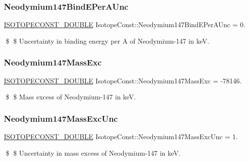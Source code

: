 \subsubsection{\texorpdfstring{Neodymium147\+Bind\+E\+Per\+A\+Unc}{Neodymium147BindEPerAUnc}}
{\footnotesize\ttfamily \mbox{\hyperlink{group___isotope_const-_macros_ga8f45a7272ce02c0b4c65c44636ed719a}{I\+S\+O\+T\+O\+P\+E\+C\+O\+N\+S\+T\+\_\+\+D\+O\+U\+B\+LE}} Isotope\+Const\+::\+Neodymium147\+Bind\+E\+Per\+A\+Unc = 0.}

\$ \$ Uncertainty in binding energy per A of Neodymium-\/147 in keV. \mbox{\label{group___isotope_const-_neodymium-_nd147_ga4005e078ab1aa1b10bbb926279dfeaf1}} 
\subsubsection{\texorpdfstring{Neodymium147\+Mass\+Exc}{Neodymium147MassExc}}
{\footnotesize\ttfamily \mbox{\hyperlink{group___isotope_const-_macros_ga8f45a7272ce02c0b4c65c44636ed719a}{I\+S\+O\+T\+O\+P\+E\+C\+O\+N\+S\+T\+\_\+\+D\+O\+U\+B\+LE}} Isotope\+Const\+::\+Neodymium147\+Mass\+Exc = -\/78146.}

\$ \$ Mass excess of Neodymium-\/147 in keV. \mbox{\label{group___isotope_const-_neodymium-_nd147_ga84a8f984402d5f96350df51423b66519}} 
\subsubsection{\texorpdfstring{Neodymium147\+Mass\+Exc\+Unc}{Neodymium147MassExcUnc}}
{\footnotesize\ttfamily \mbox{\hyperlink{group___isotope_const-_macros_ga8f45a7272ce02c0b4c65c44636ed719a}{I\+S\+O\+T\+O\+P\+E\+C\+O\+N\+S\+T\+\_\+\+D\+O\+U\+B\+LE}} Isotope\+Const\+::\+Neodymium147\+Mass\+Exc\+Unc = 1.}

\$ \$ Uncertainty in mass excess of Neodymium-\/147 in keV. \mbox{\label{group___isotope_const-_neodymium-_nd147_gad95dd738844b9fc04b5e71c8650536bf}} 
